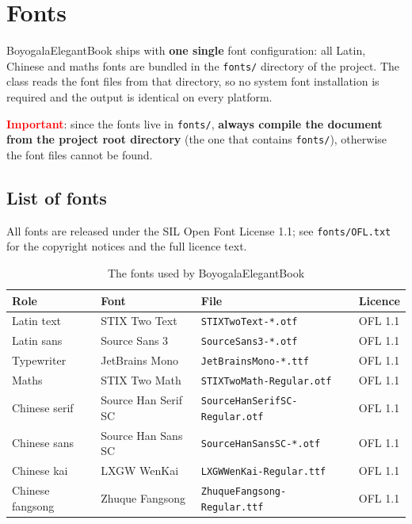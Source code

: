 \documentclass[11pt]{boyogalaelegantbook}
\begin{document}
\section{Fonts}
BoyogalaElegantBook ships with \textbf{one single} font configuration: all Latin, Chinese and maths fonts are bundled in the \lstinline{fonts/} directory of the project.  The class reads the font files from that directory, so no system font installation is required and the output is identical on every platform.

\textcolor{red}{\bfseries Important}: since the fonts live in \lstinline{fonts/}, \textbf{always compile the document from the project root directory} (the one that contains \lstinline{fonts/}), otherwise the font files cannot be found.

\subsection{List of fonts}

All fonts are released under the SIL Open Font License 1.1; see \lstinline{fonts/OFL.txt} for the copyright notices and the full licence text.

\begin{table}[htbp]
  \centering
  \caption{The fonts used by BoyogalaElegantBook}
  \begin{tabular}{llll}
  \toprule
  Role & Font & File & Licence \\
  \midrule
  Latin text & STIX Two Text & \lstinline|STIXTwoText-*.otf| & OFL 1.1 \\
  Latin sans & Source Sans 3 & \lstinline|SourceSans3-*.otf| & OFL 1.1 \\
  Typewriter & JetBrains Mono & \lstinline|JetBrainsMono-*.ttf| & OFL 1.1 \\
  Maths & STIX Two Math & \lstinline|STIXTwoMath-Regular.otf| & OFL 1.1 \\
  Chinese serif & Source Han Serif SC & \lstinline|SourceHanSerifSC-Regular.otf| & OFL 1.1 \\
  Chinese sans & Source Han Sans SC & \lstinline|SourceHanSansSC-*.otf| & OFL 1.1 \\
  Chinese kai & LXGW WenKai & \lstinline|LXGWWenKai-Regular.ttf| & OFL 1.1 \\
  Chinese fangsong & Zhuque Fangsong & \lstinline|ZhuqueFangsong-Regular.ttf| & OFL 1.1 \\
  \bottomrule
  \end{tabular}
\end{table}
\end{document}
